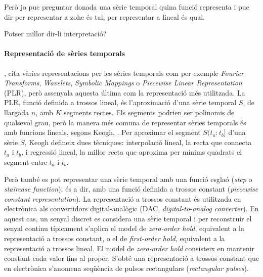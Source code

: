 Però jo puc preguntar donada una sèrie temporal quina funció representa i puc dir per representar a zohe és tal, per representar a lineal és qual. 

Potser millor dir-li interpretació?



\paragraph{Representació de sèries temporals}

\textcite{last:keogh}, cita vàries representacions per les sèries temporals com per exemple \emph{Fourier Transforms}, \emph{Wavelets}, \emph{Symbolic Mappings} o \emph{Piecewise Linear Representation} (PLR), però assenyala aquesta última com la representació més utilitzada. 
La PLR, funció definida a trossos lineal, és l'aproximació d'una sèrie temporal $S$, de llargada $n$, amb $K$ segments rectes. Els segments podrien ser polinomis de qualsevol grau, però la manera més comuna de representar sèries temporals és amb funcions lineals, segons Keogh, \cite{keogh02}.
Per aproximar el segment $S(t_a:t_b]$ d'una sèrie $S$, Keogh defineix dues tècniques: interpolació lineal, la recta que connecta $t_a$ i $t_b$, i regressió lineal, la millor recta que aproxima per mínims quadrats el segment entre $t_a$ i $t_b$.

Però també es pot representar una sèrie temporal amb una funció esglaó (\emph{step} o \emph{staircase function}); és a dir, amb una funció definida a trossos constant (\emph{piecewise constant representation}).
La representació a trossos constant és utilitzada en electrònica als convertidors digital-analògic (DAC, \emph{digital-to-analog converter}). En aquest cas, un senyal discret es considera una sèrie temporal i per reconstruir el senyal continu típicament s'aplica el model de \emph{zero-order hold}, equivalent a la representació a trossos constant,  o el de \emph{first-order hold},  equivalent a la representació a trossos lineal.
El model de \emph{zero-order hold} consisteix en mantenir constant cada valor fins al proper. S'obté una representació a trossos constant que en electrònica s'anomena seqüència de pulsos rectangulars (\emph{rectangular pulses}).






